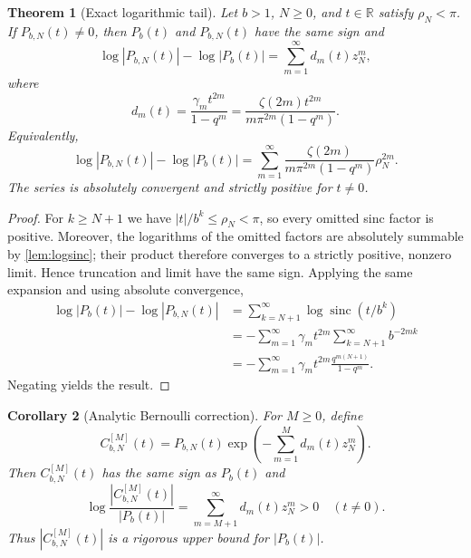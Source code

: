 \documentclass[11pt]{article}
\newtheorem{theorem}{Theorem}[section]
\newtheorem{corollary}[theorem]{Corollary}
\theoremstyle{definition}
\theoremstyle{remark}
\newcommand{\sinc}{\operatorname{sinc}}
\newcommand{\R}{\mathbb{R}}
\begin{document}
\begin{theorem}[Exact logarithmic tail]
\label{thm:exact-tail}
Let $b>1$, $N\ge0$, and $t\in\R$ satisfy $\rho_N<\pi$. If $P_{b,N}(t)\ne0$, then $P_b(t)$ and $P_{b,N}(t)$ have the same sign and
\begin{equation}
\log|P_{b,N}(t)|-\log|P_b(t)|
=\sum_{m=1}^{\infty}d_m(t)z_N^m,
\label{eq:tail-z}
\end{equation}
where
\begin{equation}
d_m(t)=\frac{\gamma_m t^{2m}}{1-q^m}
=\frac{\zeta(2m)t^{2m}}{m\pi^{2m}(1-q^m)}.
\label{eq:dm}
\end{equation}
Equivalently,
\begin{equation}
\log|P_{b,N}(t)|-\log|P_b(t)|
=\sum_{m=1}^{\infty}
\frac{\zeta(2m)}{m\pi^{2m}(1-q^m)}\rho_N^{2m}.
\label{eq:tail-rho}
\end{equation}
The series is absolutely convergent and strictly positive for $t\ne0$.
\end{theorem}

\begin{proof}
For $k\ge N+1$ we have $|t|/b^k\le\rho_N<\pi$, so every omitted sinc factor is positive.
Moreover, the logarithms of the omitted factors are absolutely summable by
\cref{lem:logsinc}; their product therefore converges to a strictly positive, nonzero
limit.  Hence truncation and limit have the same sign.  Applying the same expansion and
using absolute convergence,
\begin{align*}
\log|P_b(t)|-\log|P_{b,N}(t)|
&=\sum_{k=N+1}^{\infty}\log\sinc(t/b^k)\\
&=-\sum_{m=1}^{\infty}\gamma_m t^{2m}
\sum_{k=N+1}^{\infty}b^{-2mk}\\
&=-\sum_{m=1}^{\infty}\gamma_m t^{2m}
\frac{q^{m(N+1)}}{1-q^m}.
\end{align*}
Negating yields the result.
\end{proof}

\begin{corollary}[Analytic Bernoulli correction]
\label{cor:analytic-correction}
For $M\ge0$, define
\begin{equation}
C_{b,N}^{[M]}(t)=P_{b,N}(t)
\exp\!\left(-\sum_{m=1}^{M}d_m(t)z_N^m\right).
\label{eq:analytic-corrected}
\end{equation}
Then $C_{b,N}^{[M]}(t)$ has the same sign as $P_b(t)$ and
\begin{equation}
\log\frac{|C_{b,N}^{[M]}(t)|}{|P_b(t)|}
=\sum_{m=M+1}^{\infty}d_m(t)z_N^m>0
\quad(t\ne0).
\label{eq:analytic-correction-error}
\end{equation}
Thus $|C_{b,N}^{[M]}(t)|$ is a rigorous upper bound for $|P_b(t)|$.
\end{corollary}
\end{document}

